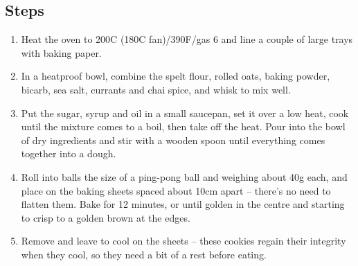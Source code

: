 \documentclass{book}
\begin{document}
\subsection*{Steps}
\begin{enumerate}
\item Heat the oven to 200C (180C fan)/390F/gas 6 and line a couple of large trays with baking paper.
\item In a heatproof bowl, combine the spelt flour, rolled oats, baking powder, bicarb, sea salt, currants and chai spice, and whisk to mix well.
\item Put the sugar, syrup and oil in a small saucepan, set it over a low heat, cook until the mixture comes to a boil, then take off the heat. Pour into the bowl of dry ingredients and stir with a wooden spoon until everything comes together into a dough.
\item Roll into balls the size of a ping-pong ball and weighing about 40g each, and place on the baking sheets spaced about 10cm apart – there’s no need to flatten them. Bake for 12 minutes, or until golden in the centre and starting to crisp to a golden brown at the edges.
\item Remove and leave to cool on the sheets – these cookies regain their integrity when they cool, so they need a bit of a rest before eating.
\end{enumerate}
\newpage
\end{document}
